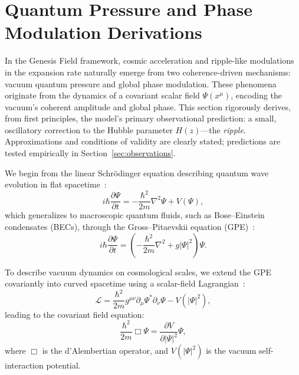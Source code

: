 \section{Quantum Pressure and Phase Modulation Derivations}
\label{sec:derivations}

In the Genesis Field framework, cosmic acceleration and ripple-like modulations in the expansion rate naturally emerge from two coherence-driven mechanisms: vacuum quantum pressure and global phase modulation. These phenomena originate from the dynamics of a covariant scalar field \( \Psi(x^\mu) \), encoding the vacuum's coherent amplitude and global phase. This section rigorously derives, from first principles, the model’s primary observational prediction: a small, oscillatory correction to the Hubble parameter \( H(z) \)—the \emph{ripple}. Approximations and conditions of validity are clearly stated; predictions are tested empirically in Section~\ref{sec:observations}.

We begin from the linear Schrödinger equation describing quantum wave evolution in flat spacetime~\cite{Schrodinger1926}:
\begin{equation}
i\hbar \frac{\partial \Psi}{\partial t} = -\frac{\hbar^2}{2m}\nabla^2\Psi + V(\Psi),
\label{eq:schrodinger}
\end{equation}
which generalizes to macroscopic quantum fluids, such as Bose–Einstein condensates (BECs), through the Gross–Pitaevskii equation (GPE)~\cite{Gross1961,Pitaevskii1961}:
\begin{equation}
i\hbar \frac{\partial \Psi}{\partial t} = \left(-\frac{\hbar^2}{2m}\nabla^2 + g|\Psi|^2\right)\Psi.
\label{eq:gpe}
\end{equation}

To describe vacuum dynamics on cosmological scales, we extend the GPE covariantly into curved spacetime using a scalar-field Lagrangian~\cite{Barcelo2005,volovik2003universe}:
\begin{equation}
\mathcal{L} = \frac{\hbar^2}{2m} g^{\mu\nu} \partial_\mu \Psi^* \partial_\nu \Psi - V(|\Psi|^2),
\label{eq:genesis_lagrangian}
\end{equation}
leading to the covariant field equation:
\begin{equation}
\frac{\hbar^2}{2m}\Box\Psi = \frac{\partial V}{\partial |\Psi|^2}\Psi,
\label{eq:field_equation}
\end{equation}
where \( \Box \) is the d'Alembertian operator, and \( V(|\Psi|^2) \) is the vacuum self-interaction potential.


